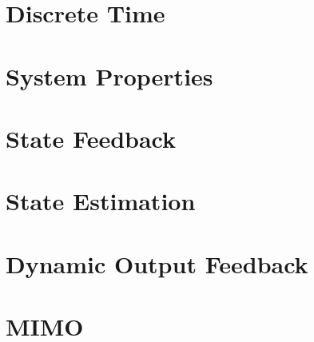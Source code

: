 \documentclass[numerate]{cheatsheet}
\author{Noa Sendlhofer - nsendlhofer@ethz.ch}
\begin{document}
\section{Discrete Time}
	
	
	
	
	
\section{System Properties}
	
	
	
	
	
\section{State Feedback}
	
	
\section{State Estimation}
	
	
\section{Dynamic Output Feedback}
	
\section{MIMO}
	
	
\end{document}
